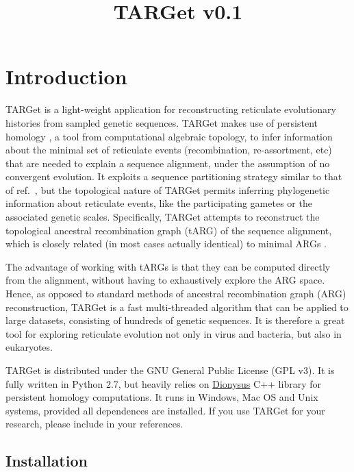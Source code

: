 \documentclass[12pt]{article}
\title{{\LARGE TARGet v0.1}}
\begin{document}
\maketitle

\newpage

\section{Introduction}
\label{sec1}

TARGet is a light-weight application for reconstructing reticulate evolutionary histories from sampled genetic sequences. TARGet makes use of persistent homology \cite{ph, ph2}, a tool from computational algebraic topology, to infer information about the minimal set of reticulate events (recombination, re-assortment, etc) that are needed 
to explain a sequence alignment, under the assumption of no convergent evolution. It exploits a sequence partitioning strategy similar to that of ref.~\cite{mg}, but the topological nature of TARGet permits inferring phylogenetic information about reticulate events, like the participating gametes or the associated genetic scales. Specifically, TARGet attempts to reconstruct the topological ancestral recombination graph (tARG) of the sequence alignment, which is closely related (in most cases actually identical) to minimal ARGs \cite{target}. 

The advantage of working with tARGs is that they can be computed directly from the alignment, without having to exhaustively explore the ARG space. Hence, as opposed to standard methods of ancestral recombination graph (ARG) reconstruction, TARGet is a fast multi-threaded algorithm that can be applied to large datasets, consisting of hundreds of genetic sequences. It is therefore a great tool for exploring reticulate evolution not only in virus and bacteria, but also in eukaryotes.

TARGet is distributed under the GNU General Public License (GPL v3). It is fully written in Python 2.7, but heavily relies on \href{http://www.mrzv.org/software/dionysus/}{Dionysus} C++ library for persistent homology computations. It runs in Windows, Mac OS and Unix systems, provided all dependences are installed. If you use TARGet for your research, please include \cite{target} in your references. 

\subsection*{Installation}
\end{document}
